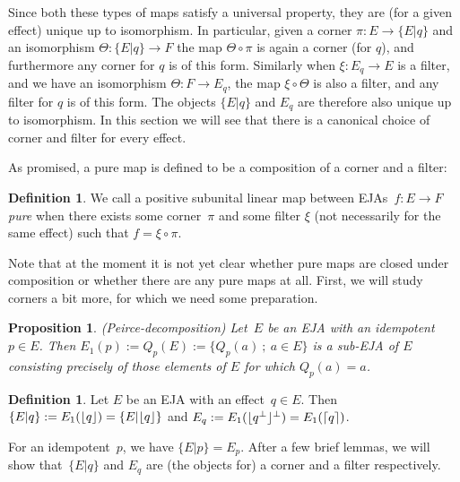 \documentclass[submission,copyright,creativecommons]{eptcs}
\newcounter{main}
\newtheorem{proposition}[main]{Proposition}
\theoremstyle{definition}
\newtheorem{definition}[main]{Definition}
\DeclarePairedDelimiter{\ceil}{\lceil}{\rceil}
\DeclarePairedDelimiter{\floor}{\lfloor}{\rfloor}
\begin{document}
Since both these types of maps satisfy a universal property, they are (for a given effect) unique up to isomorphism. In particular, given a corner $\pi\colon E\rightarrow \{E\lvert q\}$ and an isomorphism $\Theta\colon\{E\lvert q\}\rightarrow F$ the map $\Theta\circ \pi$ is again a corner (for $q$), and furthermore any corner for $q$ is of this form. Similarly when $\xi\colon E_q\rightarrow E$ is a filter, and we have an isomorphism $\Theta\colon F\rightarrow E_q$, the map $\xi\circ \Theta$ is also a filter, and any filter for $q$ is of this form. The objects $\{E\lvert q\}$ and $E_q$ are therefore also unique up to isomorphism.
In this section we will see that there is a canonical choice of corner and filter for every effect.

As promised, a pure map is defined to be a composition of a corner and a filter:
\begin{definition}\label{def:purity}
	We call a positive subunital linear map between EJAs~$f\colon E\rightarrow F$ \emph{pure} when
    there exists some corner~$\pi$ and some filter $\xi$ (not
    necessarily for the same effect) such that $f=\xi\circ \pi$.
\end{definition}
Note that at the moment it is not yet clear whether pure maps are closed under composition or whether there are any pure maps at all.  First, we will study corners a bit more, for which we need some preparation.
\begin{proposition}\label{prop:peircedecomp}
    \cite[Proposition 1.43]{alfsen2012geometry} (Peirce-decomposition)
    Let~$E$ be an EJA with an idempotent~$p \in E$.
    Then $E_1(p):=Q_p(E):=\{Q_p(a)~;~a\in E\}$ is a sub-EJA of $E$ consisting precisely of those elements of $E$ for which $Q_p(a)=a$.
\end{proposition}

\begin{definition}
	Let $E$ be an EJA with an effect~$q \in E$.
    Then~$\{E\lvert q\} := E_1(\floor{q}) = \{E\lvert \floor{q}\}$
	and $E_q := E_1(\floor{q^\perp}^\perp) = E_1(\ceil{q})$.
\end{definition}
For an idempotent~$p$, we have $\{E\lvert p\} = E_p$.
After a few brief lemmas, we will show that~$\{E\lvert q\}$ and $E_q$
    are (the objects for) a corner and a filter respectively.
\end{document}

